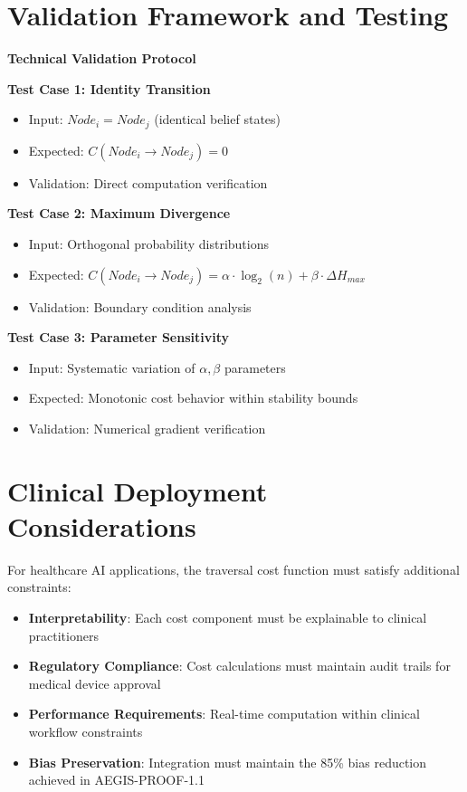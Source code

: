 \documentclass[11pt,a4paper]{article}
\begin{document}
\section{Validation Framework and Testing}

\begin{validationbox}
\textbf{Technical Validation Protocol}

\textbf{Test Case 1: Identity Transition}
\begin{itemize}
    \item Input: $Node_i = Node_j$ (identical belief states)
    \item Expected: $C(Node_i \rightarrow Node_j) = 0$
    \item Validation: Direct computation verification
\end{itemize}

\textbf{Test Case 2: Maximum Divergence}
\begin{itemize}
    \item Input: Orthogonal probability distributions
    \item Expected: $C(Node_i \rightarrow Node_j) = \alpha \cdot \log_2(n) + \beta \cdot \Delta H_{max}$
    \item Validation: Boundary condition analysis
\end{itemize}

\textbf{Test Case 3: Parameter Sensitivity}
\begin{itemize}
    \item Input: Systematic variation of $\alpha, \beta$ parameters
    \item Expected: Monotonic cost behavior within stability bounds
    \item Validation: Numerical gradient verification
\end{itemize}
\end{validationbox}

\section{Clinical Deployment Considerations}

For healthcare AI applications, the traversal cost function must satisfy additional constraints:

\begin{itemize}
    \item \textbf{Interpretability}: Each cost component must be explainable to clinical practitioners
    \item \textbf{Regulatory Compliance}: Cost calculations must maintain audit trails for medical device approval
    \item \textbf{Performance Requirements}: Real-time computation within clinical workflow constraints
    \item \textbf{Bias Preservation}: Integration must maintain the 85\% bias reduction achieved in AEGIS-PROOF-1.1
\end{itemize}
\end{document}
